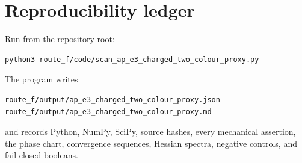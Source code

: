 \documentclass[11pt]{article}
\theoremstyle{definition}
\theoremstyle{remark}
\begin{document}
\section{Reproducibility ledger}

Run from the repository root:
\begin{verbatim}
python3 route_f/code/scan_ap_e3_charged_two_colour_proxy.py
\end{verbatim}
The program writes
\begin{verbatim}
route_f/output/ap_e3_charged_two_colour_proxy.json
route_f/output/ap_e3_charged_two_colour_proxy.md
\end{verbatim}
and records Python, NumPy, SciPy, source hashes, every mechanical assertion,
the phase chart, convergence sequences, Hessian spectra, negative controls,
and fail-closed booleans.



\end{document}
